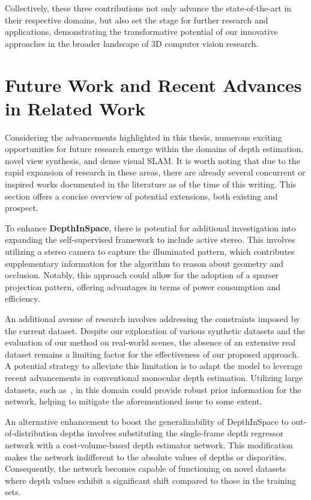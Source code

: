  Collectively, these three contributions not only advance the state-of-the-art in their respective domains, but also set the stage for further research and applications, demonstrating the transformative potential of our innovative approaches in the broader landscape of 3D computer vision research.

\section{Future Work and Recent Advances in Related Work}

Considering the advancements highlighted in this thesis, numerous exciting opportunities for future research emerge within the domains of depth estimation, novel view synthesis, and dense visual SLAM. It is worth noting that due to the rapid expansion of research in these areas, there are already several concurrent or inspired works documented in the literature as of the time of this writing. This section offers a concise overview of potential extensions, both existing and prospect.


To enhance \textbf{DepthInSpace}, there is potential for additional investigation into expanding the self-supervised framework to include active stereo. This involves utilizing a stereo camera to capture the illuminated pattern, which contributes supplementary information for the algorithm to reason about geometry and occlusion. Notably, this approach could allow for the adoption of a sparser projection pattern, offering advantages in terms of power consumption and efficiency.

An additional avenue of research involves addressing the constraints imposed by the current dataset. Despite our exploration of various synthetic datasets and the evaluation of our method on real-world scenes, the absence of an extensive real dataset remains a limiting factor for the effectiveness of our proposed approach. A potential strategy to alleviate this limitation is to adapt the model to leverage recent advancements in conventional monocular depth estimation. Utilizing large datasets, such as~\cite{ranftl2020towards}, in this domain could provide robust prior information for the network, helping to mitigate the aforementioned issue to some extent.

An alternative enhancement to boost the generalizability of DepthInSpace to out-of-distribution depths involves substituting the single-frame depth regressor network with a cost-volume-based depth estimator network. This modification makes the network indifferent to the absolute values of depths or disparities. Consequently, the network becomes capable of functioning on novel datasets where depth values exhibit a significant shift compared to those in the training sets.